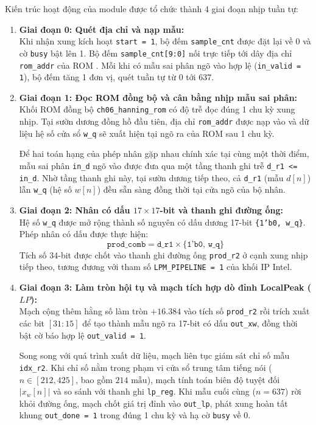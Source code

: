 Kiến trúc hoạt động của module được tổ chức thành 4 giai đoạn nhịp tuần tự:
\begin{enumerate}[leftmargin=1.5em, itemsep=2pt]
    \item \textbf{Giai đoạn 0: Quét địa chỉ và nạp mẫu:}\\
    Khi nhận xung kích hoạt \texttt{start = 1}, bộ đếm \texttt{sample\_cnt} được đặt lại về 0 và cờ \texttt{busy} bật lên 1. Bộ đếm \texttt{sample\_cnt[9:0]} nối trực tiếp tới dây địa chỉ \texttt{rom\_addr} của ROM . Mỗi khi có mẫu sai phân ngõ vào hợp lệ (\texttt{in\_valid = 1}), bộ đếm tăng 1 đơn vị, quét tuần tự từ 0 tới 637.
    
    \item \textbf{Giai đoạn 1: Đọc ROM đồng bộ và cân bằng nhịp mẫu sai phân:}\\
    Khối ROM đồng bộ \texttt{ch06\_hanning\_rom} có độ trễ đọc đúng 1 chu kỳ xung nhịp. Tại sườn dương đồng hồ đầu tiên, địa chỉ \texttt{rom\_addr} được nạp vào và dữ liệu hệ số cửa sổ \texttt{w\_q} sẽ xuất hiện tại ngõ ra của ROM sau 1 chu kỳ. 
    
    Để hai toán hạng của phép nhân gặp nhau chính xác tại cùng một thời điểm, mẫu sai phân \texttt{in\_d} ngõ vào được đưa qua một tầng thanh ghi trễ \texttt{d\_r1 <= in\_d}. Nhờ tầng thanh ghi này, tại sườn dương tiếp theo, cả \texttt{d\_r1} (mẫu $d[n]$) lẫn \texttt{w\_q} (hệ số $w[n]$) đều sẵn sàng đồng thời tại cửa ngõ của bộ nhân.
    
    \item \textbf{Giai đoạn 2: Nhân có dấu $17 \times 17$-bit và thanh ghi đường ống:}\\
    Hệ số \texttt{w\_q} được mở rộng thành số nguyên có dấu dương 17-bit \texttt{\{1'b0, w\_q\}}. Phép nhân có dấu được thực hiện:
    \begin{equation}
    \texttt{prod\_comb} = \texttt{d\_r1} \times \texttt{\{1'b0, w\_q\}}
    \end{equation}
    Tích số 34-bit được chốt vào thanh ghi đường ống \texttt{prod\_r2} ở cạnh xung nhịp tiếp theo, tương đương với tham số \texttt{LPM\_PIPELINE = 1} của khối IP Intel.
    
    \item \textbf{Giai đoạn 3: Làm tròn hội tụ và mạch tích hợp dò đỉnh LocalPeak ($LP$):}\\
    Mạch cộng thêm hằng số làm tròn $+16.384$ vào tích số \texttt{prod\_r2} rồi trích xuất các bit $[31:15]$ để tạo thành mẫu ngõ ra 17-bit có dấu \texttt{out\_xw}, đồng thời bật cờ báo hợp lệ \texttt{out\_valid = 1}.
    
    Song song với quá trình xuất dữ liệu, mạch liên tục giám sát chỉ số mẫu \texttt{idx\_r2}. Khi chỉ số nằm trong phạm vi cửa sổ trung tâm tiếng nói ($n \in [212, 425]$, bao gồm $214\text{ mẫu}$), mạch tính toán biên độ tuyệt đối $|x_w[n]|$ và so sánh với thanh ghi \texttt{lp\_reg}. Khi mẫu cuối cùng ($n = 637$) rời khỏi đường ống, mạch chốt giá trị đỉnh vào \texttt{out\_lp}, phát xung hoàn tất khung \texttt{out\_done = 1} trong đúng 1 chu kỳ và hạ cờ \texttt{busy} về 0.
\end{enumerate}

